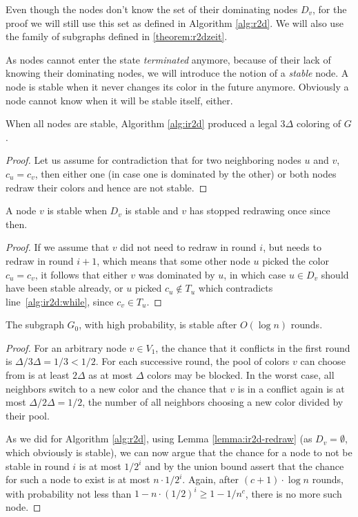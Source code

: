 Even though the nodes don't know the set of their dominating nodes $D_v$, for the proof we will still use this set as defined in Algorithm \ref{alg:r2d}. We will also use the family of subgraphs defined in \ref{theorem:r2dzeit}.

As nodes cannot enter the state \textit{terminated} anymore, because of their lack of knowing their dominating nodes, we will introduce the notion of a \textit{stable} node. A node is stable when it never changes its color in the future anymore. Obviously a node cannot know when it will be stable itself, either.

\begin{lemma}\label{lemma:ir2d-proof}
	When all nodes are stable, Algorithm \ref{alg:ir2d} produced a legal $3\Delta$ coloring of $G$.
\end{lemma}
\begin{proof}
	Let us assume for contradiction that for two neighboring nodes $u$ and $v$, $c_u = c_v$, then either one (in case one is dominated by the other) or both nodes redraw their colors and hence are not stable.
\end{proof}

\begin{lemma}\label{lemma:ir2d-redraw}
	A node $v$ is stable when $D_v$ is stable and $v$ has stopped redrawing once since then.
\end{lemma}
\begin{proof}
	If we assume that $v$ did not need to redraw in round $i$, but needs to redraw in round $i+1$, which means that some other node $u$ picked the color $c_u = c_v$, it follows that either $v$ was dominated by $u$, in which case $u \in D_v$ should have been stable already, or $u$ picked $c_u \notin T_u$ which contradicts line~\ref{alg:ir2d:while}, since $c_v \in T_u$.
\end{proof}

\begin{lemma}\label{lemma:ir2d-zeit}
	The subgraph $G_0$, with high probability, is stable after $O(\log n)$ rounds.
\end{lemma}
\begin{proof}
	For an arbitrary node $v \in V_1$, the chance that it conflicts in the first round is $\Delta / 3\Delta = 1/3 < 1/2$. For each successive round, the pool of colors $v$ can choose from is at least $2\Delta$ as at most $\Delta$ colors may be blocked. In the worst case, all neighbors switch to a new color and the chance that $v$ is in a conflict again is at most $\Delta / 2\Delta = 1/2$, the number of all neighbors choosing a new color divided by their pool.
	
	As we did for Algorithm \ref{alg:r2d}, using Lemma \ref{lemma:ir2d-redraw} (as $D_v = \emptyset$, which obviously is stable), we can now argue that the chance for a node to not be stable in round $i$ is at most $1/2^i$ and by the union bound assert that the chance for such a node to exist is at most $n \cdot 1/2^i$. Again, after $(c+1) \cdot \log n$ rounds, with probability not less than $1-n \cdot (1/2)^i \geq 1-1/n^c$, there is no more such node.
\end{proof}

